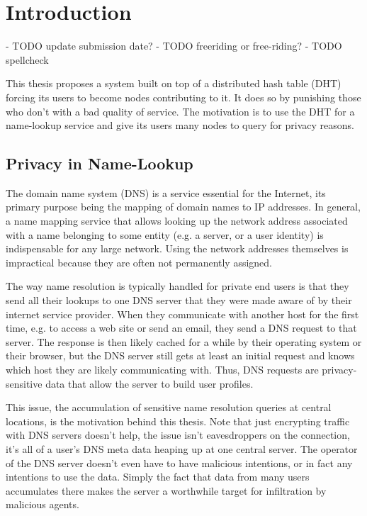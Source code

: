 \chapter{Introduction}
- TODO update submission date?
- TODO freeriding or free-riding?
- TODO spellcheck

This thesis proposes a system built on top of a distributed hash table (DHT)
forcing its users to become nodes contributing to it. It does so by punishing
those who don't with a bad quality of service. The motivation is to use the DHT
for a name-lookup service and give its users many nodes to query for privacy
reasons.

\section{Privacy in Name-Lookup}
The domain name system (DNS) is a service essential for the Internet, its
primary purpose being the mapping of domain names to IP addresses. In general, a
name mapping service that allows looking up the network address associated with
a name belonging to some entity (e.g. a server, or a user identity) is
indispensable for any large network. Using the network addresses themselves is
impractical because they are often not permanently assigned.

The way name resolution is typically handled for private end users is that they
send all their lookups to one DNS server that they were made aware of by their
internet service provider. When they communicate with another host for the first
time, e.g. to access a web site or send an email, they send a DNS request to
that server. The response is then likely cached for a while by their
operating system or their browser, but the DNS server still gets at least an
initial request and knows which host they are likely communicating with. Thus,
DNS requests are privacy-sensitive data that allow the server to build user
profiles.

This issue, the accumulation of sensitive name resolution queries at central
locations, is the motivation behind this thesis. Note that just encrypting
traffic with DNS servers doesn't help, the issue isn't eavesdroppers on the
connection, it's all of a user's DNS meta data heaping up at one central server.
The operator of the DNS server doesn't even have to have malicious intentions,
or in fact any intentions to use the data. Simply the fact that data from many
users accumulates there makes the server a worthwhile target for infiltration by
malicious agents.

